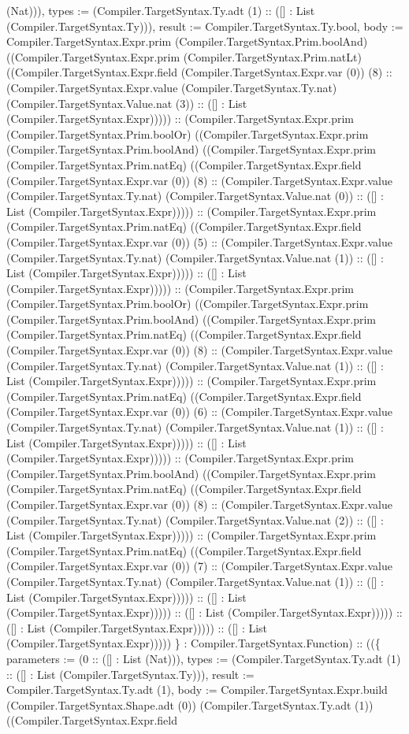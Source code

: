 \documentclass[11pt]{article}
\begin{document}
(Nat))), types := (Compiler.TargetSyntax.Ty.adt (1) :: ([] : List (Compiler.TargetSyntax.Ty))), result := Compiler.TargetSyntax.Ty.bool, body := Compiler.TargetSyntax.Expr.prim (Compiler.TargetSyntax.Prim.boolAnd) ((Compiler.TargetSyntax.Expr.prim (Compiler.TargetSyntax.Prim.natLt) ((Compiler.TargetSyntax.Expr.field (Compiler.TargetSyntax.Expr.var (0)) (8) :: (Compiler.TargetSyntax.Expr.value (Compiler.TargetSyntax.Ty.nat) (Compiler.TargetSyntax.Value.nat (3)) :: ([] : List (Compiler.TargetSyntax.Expr))))) :: (Compiler.TargetSyntax.Expr.prim (Compiler.TargetSyntax.Prim.boolOr) ((Compiler.TargetSyntax.Expr.prim (Compiler.TargetSyntax.Prim.boolAnd) ((Compiler.TargetSyntax.Expr.prim (Compiler.TargetSyntax.Prim.natEq) ((Compiler.TargetSyntax.Expr.field (Compiler.TargetSyntax.Expr.var (0)) (8) :: (Compiler.TargetSyntax.Expr.value (Compiler.TargetSyntax.Ty.nat) (Compiler.TargetSyntax.Value.nat (0)) :: ([] : List (Compiler.TargetSyntax.Expr))))) :: (Compiler.TargetSyntax.Expr.prim (Compiler.TargetSyntax.Prim.natEq) ((Compiler.TargetSyntax.Expr.field (Compiler.TargetSyntax.Expr.var (0)) (5) :: (Compiler.TargetSyntax.Expr.value (Compiler.TargetSyntax.Ty.nat) (Compiler.TargetSyntax.Value.nat (1)) :: ([] : List (Compiler.TargetSyntax.Expr))))) :: ([] : List (Compiler.TargetSyntax.Expr))))) :: (Compiler.TargetSyntax.Expr.prim (Compiler.TargetSyntax.Prim.boolOr) ((Compiler.TargetSyntax.Expr.prim (Compiler.TargetSyntax.Prim.boolAnd) ((Compiler.TargetSyntax.Expr.prim (Compiler.TargetSyntax.Prim.natEq) ((Compiler.TargetSyntax.Expr.field (Compiler.TargetSyntax.Expr.var (0)) (8) :: (Compiler.TargetSyntax.Expr.value (Compiler.TargetSyntax.Ty.nat) (Compiler.TargetSyntax.Value.nat (1)) :: ([] : List (Compiler.TargetSyntax.Expr))))) :: (Compiler.TargetSyntax.Expr.prim (Compiler.TargetSyntax.Prim.natEq) ((Compiler.TargetSyntax.Expr.field (Compiler.TargetSyntax.Expr.var (0)) (6) :: (Compiler.TargetSyntax.Expr.value (Compiler.TargetSyntax.Ty.nat) (Compiler.TargetSyntax.Value.nat (1)) :: ([] : List (Compiler.TargetSyntax.Expr))))) :: ([] : List (Compiler.TargetSyntax.Expr))))) :: (Compiler.TargetSyntax.Expr.prim (Compiler.TargetSyntax.Prim.boolAnd) ((Compiler.TargetSyntax.Expr.prim (Compiler.TargetSyntax.Prim.natEq) ((Compiler.TargetSyntax.Expr.field (Compiler.TargetSyntax.Expr.var (0)) (8) :: (Compiler.TargetSyntax.Expr.value (Compiler.TargetSyntax.Ty.nat) (Compiler.TargetSyntax.Value.nat (2)) :: ([] : List (Compiler.TargetSyntax.Expr))))) :: (Compiler.TargetSyntax.Expr.prim (Compiler.TargetSyntax.Prim.natEq) ((Compiler.TargetSyntax.Expr.field (Compiler.TargetSyntax.Expr.var (0)) (7) :: (Compiler.TargetSyntax.Expr.value (Compiler.TargetSyntax.Ty.nat) (Compiler.TargetSyntax.Value.nat (1)) :: ([] : List (Compiler.TargetSyntax.Expr))))) :: ([] : List (Compiler.TargetSyntax.Expr))))) :: ([] : List (Compiler.TargetSyntax.Expr))))) :: ([] : List (Compiler.TargetSyntax.Expr))))) :: ([] : List (Compiler.TargetSyntax.Expr))))) \} : Compiler.TargetSyntax.Function) :: ((\{ parameters := (0 :: ([] : List (Nat))), types := (Compiler.TargetSyntax.Ty.adt (1) :: ([] : List (Compiler.TargetSyntax.Ty))), result := Compiler.TargetSyntax.Ty.adt (1), body := Compiler.TargetSyntax.Expr.build (Compiler.TargetSyntax.Shape.adt (0)) (Compiler.TargetSyntax.Ty.adt (1)) ((Compiler.TargetSyntax.Expr.field 
\end{document}
